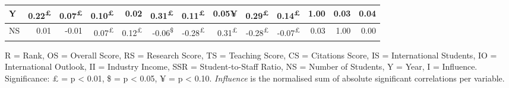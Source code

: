 \documentclass{singlecol-new}
\theoremstyle{TH}{
\newtheorem{lemma}{Lemma}
\newtheorem{theorem}[lemma]{Theorem}
\newtheorem{corrolary}[lemma]{Corrolary}
\newtheorem{conjecture}[lemma]{Conjecture}
\newtheorem{proposition}[lemma]{Proposition}
\newtheorem{claim}[lemma]{Claim}
\newtheorem{stheorem}[lemma]{Wrong Theorem}
\newtheorem{algorithm}{Algorithm}
}
\theoremstyle{THrm}{
\newtheorem{definition}{Definition}[section]
\newtheorem{question}{Question}[section]
\newtheorem{remark}{Remark}
\newtheorem{scheme}{Scheme}
}
\theoremstyle{THhit}{
\newtheorem{case}{Case}[section]
}
\begin{document}
\begin{table*}[h!]
\begin{tabular}{|l|r|r|r|r|r|r|r|r|r|r|r|r|}
		Y & \cellcolor{gray!11}0.22\textsuperscript{£} & \cellcolor{gray!3}0.07\textsuperscript{£} & \cellcolor{gray!5}0.10\textsuperscript{£} & \cellcolor{gray!1}0.02 & \cellcolor{gray!15}0.31\textsuperscript{£} & \cellcolor{gray!5}0.11\textsuperscript{£} & \cellcolor{gray!2}0.05¥ & \cellcolor{gray!14}0.29\textsuperscript{£} & \cellcolor{gray!7}0.14\textsuperscript{£} & \cellcolor{gray!50}1.00 & \cellcolor{gray!1}0.03 & 0.04 \\ \hline
		
		NS & \cellcolor{gray!0}0.01 & \cellcolor{gray!0}-0.01 & \cellcolor{gray!3}0.07\textsuperscript{£} & \cellcolor{gray!6}0.12\textsuperscript{£} & \cellcolor{gray!3}-0.06\textsuperscript{\$} & \cellcolor{gray!14}-0.28\textsuperscript{£} & \cellcolor{gray!15}0.31\textsuperscript{£} & \cellcolor{gray!14}-0.28\textsuperscript{£} & \cellcolor{gray!3}-0.07\textsuperscript{£} & \cellcolor{gray!1}0.03  & \cellcolor{gray!50}1.00 & 0.00 \\ \hline
	\end{tabular}
	\vspace{1mm}
	
	\scriptsize \raggedleft
	R = Rank, OS = Overall Score, RS = Research Score, TS = Teaching Score, CS = Citations Score, IS = International Students, IO = International Outlook, II = Industry Income, SSR = Student-to-Staff Ratio, NS = Number of Students, Y = Year, I = Influence. Significance: £ = p < 0.01, \$ = p < 0.05, ¥  = p < 0.10. \textit{Influence} is the normalised sum of absolute significant correlations per variable.
\end{table*}
\end{document}
